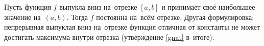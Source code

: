 
    Пусть функция $f$ выпукла вниз на~отрезке $[a,b]$ и принимает своё наибольшее значение на~$(a,b)$. Тогда $f$ постоянна на~всём отрезке.
    Другая формулировка: непрерывная выпуклая вниз на~отрезке функция отличная от константы не может достигать максимума внутри отрезка (утверждение \ref{gnat} в~итоге).
